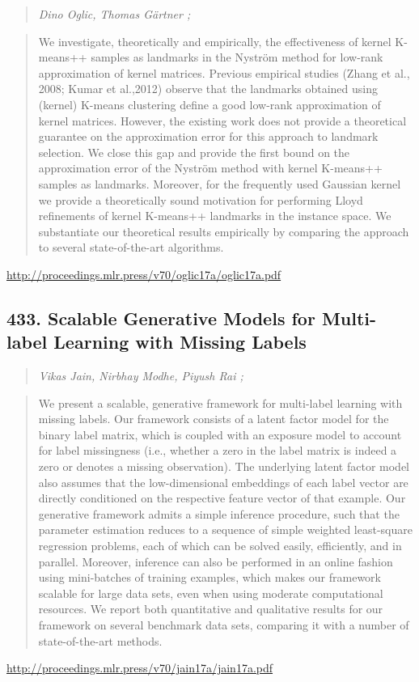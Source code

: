 \documentclass{article}
\begin{document}
\begin{quote}
\footnotesize{\textit{Dino Oglic, Thomas Gärtner ;}}
\end{quote}

\begin{quote}
    We investigate, theoretically and empirically, the effectiveness of kernel K-means++ samples as landmarks in the Nyström method for low-rank approximation of kernel matrices. Previous empirical studies (Zhang et al., 2008; Kumar et al.,2012) observe that the landmarks obtained using (kernel) K-means clustering define a good low-rank approximation of kernel matrices. However, the existing work does not provide a theoretical guarantee on the approximation error for this approach to landmark selection. We close this gap and provide the first bound on the approximation error of the Nyström method with kernel K-means++ samples as landmarks. Moreover, for the frequently used Gaussian kernel we provide a theoretically sound motivation for performing Lloyd refinements of kernel K-means++ landmarks in the instance space. We substantiate our theoretical results empirically by comparing the approach to several state-of-the-art algorithms.  \end{quote}

\href{http://proceedings.mlr.press/v70/oglic17a/oglic17a.pdf}{http://proceedings.mlr.press/v70/oglic17a/oglic17a.pdf}

\subsection{433. Scalable Generative Models for Multi-label Learning with Missing Labels}

\begin{quote}
\footnotesize{\textit{Vikas Jain, Nirbhay Modhe, Piyush Rai ;}}
\end{quote}

\begin{quote}
    We present a scalable, generative framework for multi-label learning with missing labels. Our framework consists of a latent factor model for the binary label matrix, which is coupled with an exposure model to account for label missingness (i.e., whether a zero in the label matrix is indeed a zero or denotes a missing observation). The underlying latent factor model also assumes that the low-dimensional embeddings of each label vector are directly conditioned on the respective feature vector of that example. Our generative framework admits a simple inference procedure, such that the parameter estimation reduces to a sequence of simple weighted least-square regression problems, each of which can be solved easily, efficiently, and in parallel. Moreover, inference can also be performed in an online fashion using mini-batches of training examples, which makes our framework scalable for large data sets, even when using moderate computational resources. We report both quantitative and qualitative results for our framework on several benchmark data sets, comparing it with a number of state-of-the-art methods.  \end{quote}

\href{http://proceedings.mlr.press/v70/jain17a/jain17a.pdf}{http://proceedings.mlr.press/v70/jain17a/jain17a.pdf}
\end{document}
